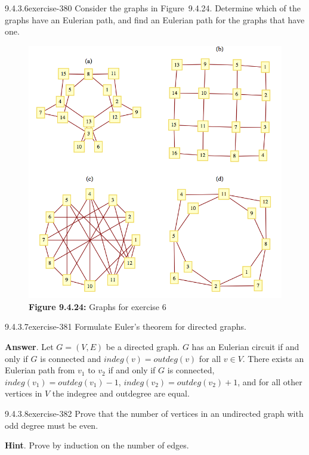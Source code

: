 \documentclass[twoside,10pt,]{book}
\numberwithin{equation}{section}
\begin{document}
\begin{divisionsolution}{9.4.3.6}{}{exercise-380}%
\hypertarget{p-3269}{}%
Consider the graphs in Figure~9.4.24. Determine which of the graphs have an Eulerian path, and find an Eulerian path for the graphs that have one.%
\begin{figure}
\centering
\includegraphics[width=1\linewidth]{images/fig-exercise-9-4-6.png}
\caption*{\textbf{Figure 9.4.24:} Graphs for exercise 6}
\end{figure}
\end{divisionsolution}%
\begin{divisionsolution}{9.4.3.7}{}{exercise-381}%
\hypertarget{p-3270}{}%
Formulate Euler's theorem for directed graphs.%
\par\smallskip%
\noindent\textbf{Answer}.\quad%
\hypertarget{p-3271}{}%
Let  \(G=(V,E)\) be a directed graph. \(G\) has an Eulerian circuit if and only if \(G\) is connected and \(indeg(v)= outdeg(v)\) for all \(v \in V\). There exists an Eulerian path from  \(v_1 \textrm{ to } v_2\)  if and only if \(G\) is connected, \(indeg(v_1)=outdeg(v_1)-1\), \(indeg(v_2)= outdeg(v_2)+1\), and for all other vertices in \(V\) the indegree and outdegree are equal.%
\end{divisionsolution}%
\begin{divisionsolution}{9.4.3.8}{}{exercise-382}%
\hypertarget{p-3272}{}%
Prove that the number of vertices in an undirected graph with odd degree must be even.%
\par\smallskip%
\noindent\textbf{Hint}.\quad%
\hypertarget{p-3273}{}%
Prove by induction on the number of edges.%
\end{divisionsolution}%
\end{document}

